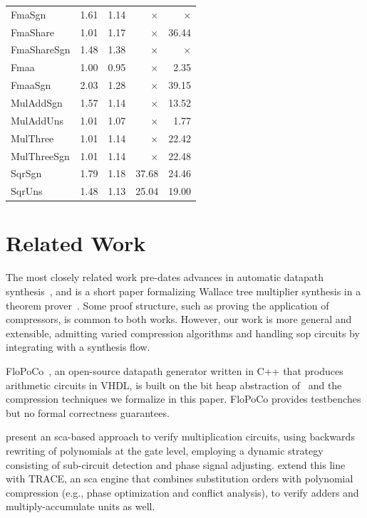 \documentclass[conference]{IEEEtran}
\theoremstyle{plain}
\theoremstyle{definition}
\begin{document}
\begin{table}
\begin{tabular}{lrrrr}
    FmaSgn & 1.61 & 1.14 & $\times$ & $\times$ \\
    FmaShare & 1.01 & 1.17 & $\times$ & 36.44 \\
    FmaShareSgn & 1.48 & 1.38 & $\times$ & $\times$ \\
    Fmaa & 1.00 & 0.95 & $\times$ & 2.35 \\
    FmaaSgn & 2.03 & 1.28 & $\times$ & 39.15 \\
    MulAddSgn & 1.57 & 1.14 & $\times$ & 13.52 \\
    MulAddUns & 1.01 & 1.07 & $\times$ & 1.77 \\
    MulThree & 1.01 & 1.14 & $\times$ & 22.42 \\
    MulThreeSgn & 1.01 & 1.14 & $\times$ & 22.48 \\
    SqrSgn & 1.79 & 1.18 & 37.68 & 24.46 \\
    SqrUns & 1.48 & 1.13 & 25.04 & 19.00 \\
    \bottomrule
  \end{tabular}
\end{table}


\section{Related Work}
The most closely related work pre-dates advances in automatic datapath synthesis~\cite{Zimmermann2009DatapathDesign},
and is a short paper formalizing Wallace tree multiplier synthesis in a theorem prover~\cite{verified_wallace}.
Some proof structure, such as proving the application of compressors, is common to both works. 
However, our work is more general and extensible, admitting varied compression algorithms and
handling \ac{sop} circuits by integrating with a synthesis flow.

FloPoCo~\cite{application_specific_arithmetic,DinechinPasca2011-DaT}, an open-source datapath generator written in C++ that produces
arithmetic circuits in VHDL, is built on the bit heap abstraction of~\citet{arithmetic_core_generation_bitheaps} and the compression techniques we formalize in this paper.
FloPoCo provides testbenches but no formal correctness guarantees.

\citet{sca} present an \ac{sca}-based approach to verify multiplication circuits, 
using backwards rewriting of polynomials at the gate level, employing a dynamic strategy consisting of sub-circuit detection and phase signal adjusting.
\citet{trace} extend this line with TRACE, an \ac{sca} engine that combines substitution orders with polynomial compression (e.g., phase optimization and conflict analysis), 
to verify adders and multiply-accumulate units as well.
\end{document}
